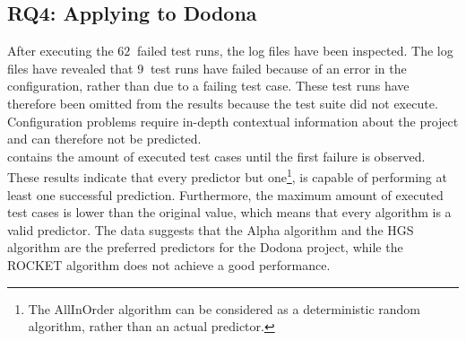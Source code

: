 \subsection{RQ4: Applying \tcp{} to Dodona}
After executing the $\SI{62}{}$ failed test runs, the log files have been inspected. The log files have revealed that $\SI{9}{}$ test runs have failed because of an error in the configuration, rather than due to a failing test case. These test runs have therefore been omitted from the results because the test suite did not execute. Configuration problems require in-depth contextual information about the project and can therefore not be predicted.\\

\noindent {} contains the amount of executed test cases until the first failure is observed. These results indicate that every predictor but one\footnote{The AllInOrder algorithm can be considered as a  deterministic random algorithm, rather than an actual predictor.}, is capable of performing at least one successful prediction. Furthermore, the maximum amount of executed test cases is lower than the original value, which means that every algorithm is a valid predictor. The data suggests that the Alpha algorithm and the HGS algorithm are the preferred predictors for the Dodona project, while the ROCKET algorithm does not achieve a good performance.

